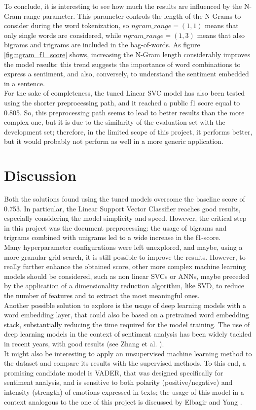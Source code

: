 \documentclass[conference]{IEEEtran}
\begin{document}
To conclude, it is interesting to see how much the results are influenced by the N-Gram range parameter. This parameter controls the length of the N-Grams to consider during the word tokenization, so $ngram\_range=(1,1)$ means that only single words are considered, while $ngram\_range=(1,3)$ means that also bigrams and trigrams are included in the bag-of-words. As figure \ref{fig:ngram_f1_score} shows, increasing the N-Gram length considerably improves the model results: this trend suggests the importance of word combinations to express a sentiment, and also, conversely, to understand the sentiment embedded in a sentence.\\
For the sake of completeness, the tuned Linear SVC model has also been tested using the shorter preprocessing path, and it reached a public f1 score equal to 0.805. So, this preprocessing path seems to lead to better results than the more complex one, but it is due to the similarity of the evaluation set with the development set; therefore, in the limited scope of this project, it performs better, but it would probably not perform as well in a more generic application.

\section{Discussion}
Both the solutions found using the tuned models overcome the baseline score of 0.753. In particular, the Linear Support Vector Classifier reaches good results, especially considering the model simplicity and speed. However, the critical step in this project was the document preprocessing: the usage of bigrams and trigrams combined with unigrams led to a wide increase in the f1-score.\\
Many hyperparameter configurations were left unexplored, and maybe, using a more granular grid search, it is still possible to improve the results. However, to really further enhance the obtained score, other more complex machine learning models should be considered, such as non linear SVCs or ANNs, maybe preceded by the application of a dimensionality reduction algorithm, like SVD, to reduce the number of features and to extract the most meaningful ones. \\Another possible solution to explore is the usage of deep learning models with a word embedding layer, that could also be based on a pretrained word embedding stack, substantially reducing the time required for the model training. The use of deep learning models in the context of sentiment analysis has been widely tackled in recent years, with good results (see Zhang et al. \cite{ZhangLeiWangShuaiLiuBing}). \\It might also be interesting to apply an unsupervised machine learning method to the dataset and compare its results with the supervised methods. To this end, a promising candidate model is VADER, that was designed specifically for sentiment analysis, and is sensitive to both polarity (positive/negative) and intensity (strength) of emotions expressed in texts; the usage of this model in a context analogous to the one of this project is discussed by Elbagir and Yang \cite{elbagir2019twitter}.



\end{document}
